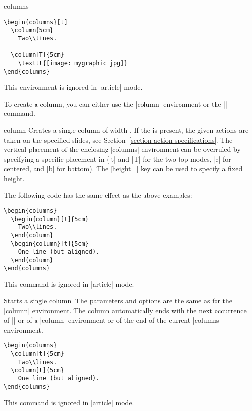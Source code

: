 \begin{environment}{{columns}}
  \example
\begin{verbatim}
\begin{columns}[t]
  \column{5cm}
    Two\\lines.

  \column[T]{5cm}
    \texttt{[image: mygraphic.jpg]}
\end{columns}
\end{verbatim}

  \articlenote
  This environment is ignored in |article| mode.

\end{environment}

To create a column, you can either use the |column| environment or the |\column| command.

\begin{environment}{{column}}
  Creates a single column of width . If the  is present, the given actions are taken on the specified slides, see Section~\ref{section-action-specifications}. The vertical placement of the enclosing |columns| environment can be overruled by specifying a specific placement in  (|t| and |T| for the two top modes, |c| for centered, and |b| for bottom). The |height=| key can be used to specify a fixed height.

  \example
  The following code has the same effect as the above examples:
\begin{verbatim}
\begin{columns}
  \begin{column}[t]{5cm}
    Two\\lines.
  \end{column}
  \begin{column}[t]{5cm}
    One line (but aligned).
  \end{column}
\end{columns}
\end{verbatim}

  \articlenote
  This command is ignored in |article| mode.

\end{environment}

\begin{command}{{\column}}
  Starts a single column. The parameters and options are the same as for the |column| environment. The column automatically ends with the next occurrence of |\column| or of a |column| environment or of the end of the current |columns| environment.

  \example
\begin{verbatim}
\begin{columns}
  \column[t]{5cm}
    Two\\lines.
  \column[t]{5cm}
    One line (but aligned).
\end{columns}
\end{verbatim}

  \articlenote
  This command is ignored in |article| mode.

\end{command}


